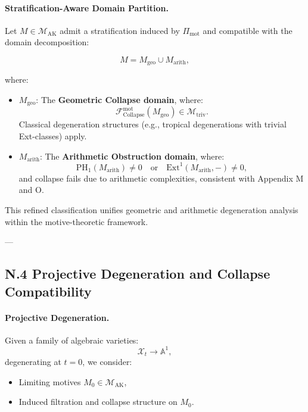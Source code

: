 \documentclass[11pt]{article}
\begin{document}
\paragraph{Stratification-Aware Domain Partition.}

Let \( M \in \mathcal{M}_{\mathrm{AK}} \) admit a stratification induced by \( \Pi_{\mathrm{mot}} \) and compatible with the domain decomposition:

\[
M = M_{\mathrm{geo}} \cup M_{\mathrm{arith}},
\]

where:

\begin{itemize}
    \item \( M_{\mathrm{geo}} \): The \textbf{Geometric Collapse domain}, where:
    \[
    \mathcal{F}_{\mathrm{Collapse}}^{\mathrm{mot}}(M_{\mathrm{geo}}) \in \mathcal{M}_{\mathrm{triv}}.
    \]
    Classical degeneration structures (e.g., tropical degenerations with trivial Ext-classes) apply.

    \item \( M_{\mathrm{arith}} \): The \textbf{Arithmetic Obstruction domain}, where:
    \[
    \mathrm{PH}_1(M_{\mathrm{arith}}) \neq 0 \quad \text{or} \quad \mathrm{Ext}^1(M_{\mathrm{arith}}, -) \neq 0,
    \]
    and collapse fails due to arithmetic complexities, consistent with Appendix M and O.
\end{itemize}

This refined classification unifies geometric and arithmetic degeneration analysis within the motive-theoretic framework.

---

\subsection*{N.4 Projective Degeneration and Collapse Compatibility}

\paragraph{Projective Degeneration.}
Given a family of algebraic varieties:
\[
\mathcal{X}_t \to \mathbb{A}^1,
\]
degenerating at \( t = 0 \), we consider:
\begin{itemize}
  \item Limiting motives \( M_0 \in \mathcal{M}_{\mathrm{AK}} \),
  \item Induced filtration and collapse structure on \( M_0 \).
\end{itemize}
\end{document}
